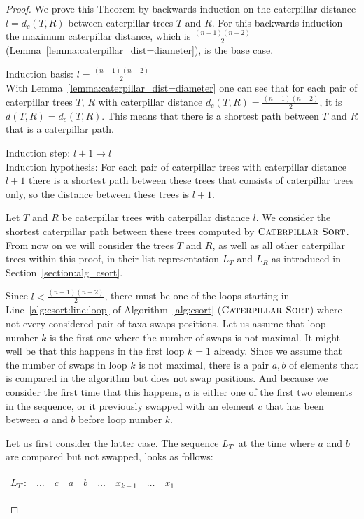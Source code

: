 \documentclass{amsart}
\newcommand{\csort}{\textsc{Caterpillar Sort}}
\begin{document}
\begin{proof}
    We prove this Theorem by backwards induction on the caterpillar distance $l = d_c(T,R)$ between caterpillar trees $T$ and $R$.
    For this backwards induction the maximum caterpillar distance, which is $\frac{(n-1)(n-2)}{2}$ (Lemma~\ref{lemma:caterpillar_dist=diameter}), is the base case.

    Induction basis: $l = \frac{(n-1)(n-2)}{2}$\\
    With Lemma~\ref{lemma:caterpillar_dist=diameter} one can see that for each pair of caterpillar trees $T$, $R$ with caterpillar distance $d_c(T,R) = \frac{(n-1)(n-2)}{2}$, it is $d(T,R) = d_c(T,R)$.
    This means that there is a shortest path between $T$ and $R$ that is a caterpillar path.

    Induction step: $l+1 \to l$\\
    Induction hypothesis: For each pair of caterpillar trees with caterpillar distance $l+1$ there is a shortest path between these trees that consists of caterpillar trees only, so the distance between these trees is $l+1$.

    Let $T$ and $R$ be caterpillar trees with caterpillar distance $l$.
    We consider the shortest caterpillar path between these trees computed by $\csort$.
    From now on we will consider the trees $T$ and $R$, as well as all other caterpillar trees within this proof, in their list representation $L_T$ and $L_R$ as introduced in Section~\ref{section:alg_csort}.

    Since $l < \frac{(n-1)(n-2)}{2}$, there must be one of the loops starting in Line~\ref{alg:csort:line:loop} of Algorithm~\ref{alg:csort} ($\csort$) where not every considered pair of taxa swaps positions.
    Let us assume that loop number $k$ is the first one where the number of swaps is not maximal.
    It might well be that this happens in the first loop $k=1$ already.
    Since we assume that the number of swaps in loop $k$ is not maximal, there is a pair $a,b$ of elements that is compared in the algorithm but does not swap positions.
    And because we consider the first time that this happens, $a$ is either one of the first two elements in the sequence, or it previously swapped with an element $c$ that has been between $a$ and $b$ before loop number $k$.

    Let us first consider the latter case.
    The sequence $L_{T'}$ at the time where $a$ and $b$ are compared but not swapped, looks as follows:

    \vspace{12pt}
    \begin{tabular}{c|c|c|c|c|c|c|c|c|}
        \cline{2-9}
        $L_{T'}$: & $\ldots$ & $c$ & $a$ & $b$ & $\ldots$& $x_{k-1}$ & $\ldots$ & $x_1$\\
        \cline{2-9}
    \end{tabular}
    \vspace{12pt}


\end{proof}
\end{document}
